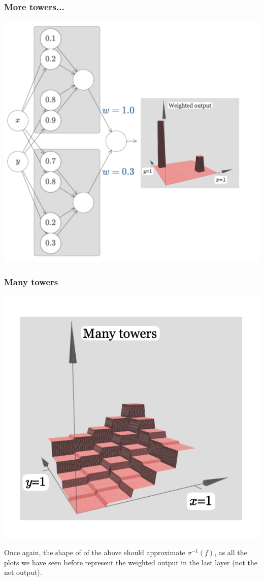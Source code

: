 \documentclass[usenames,dvipsnames]{beamer}
\begin{document}
\begin{frame}
  \frametitle{More towers...}
  
 \centering
  \includegraphics[scale=.35]{more-towers}
  
\end{frame}


\begin{frame}
  \frametitle{Many towers}
  
   \centering
  \includegraphics[scale=.35]{many-towers}
  
  \flushleft
  Once again, the shape of of the above should approximate $\sigma^{-1}(f)$, as all the plots we have seen before represent the weighted output in the last layer (not the net output).
  
\end{frame}
\end{document}
